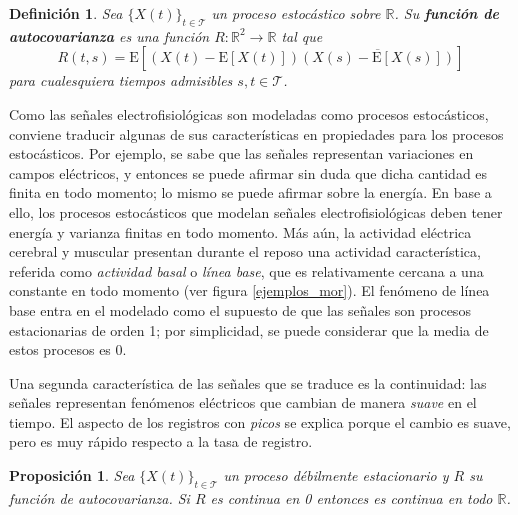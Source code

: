 \documentclass[12pt,letterpaper]{book}
\newtheorem{definicion}{Definición}[chapter]
\newtheorem{proposicion}[teorema]{Proposición}
\newcommand{\R}{\mathbb{R}}
\newcommand{\E}[1]{\mathrm{E}\left[ #1 \right]}
\newcommand{\xt}{$\{X(t)\}_{t\in \mathcal{T}}$ }
\begin{document}
\begin{definicion}
Sea \xt un proceso estocástico sobre $\R$. Su \textbf{función de autocovarianza} es una función $R: \R^{2}\rightarrow \R$ tal que
\begin{equation}
R(t,s) = \E{\left(X(t) - \E{X(t)}\right)\overline{\left(X(s) - \E{X(s)}\right)}}
\end{equation} 
para cualesquiera tiempos admisibles $s, t \in \mathcal{T}$.
\end{definicion}

Como las señales electrofisiológicas son modeladas como procesos estocásticos, conviene traducir algunas de sus características en propiedades para los procesos estocásticos.
%
Por ejemplo, se sabe que las señales representan variaciones en campos eléctricos, y entonces se puede afirmar sin duda que dicha cantidad es finita en todo momento; lo mismo se puede afirmar sobre la energía.
%
En base a ello, los procesos estocásticos que modelan señales electrofisiológicas deben tener energía y varianza finitas en todo momento.
%
Más aún, la actividad eléctrica cerebral y muscular presentan durante el reposo una actividad característica, referida como \textit{actividad basal} o \textit{línea base}, que es relativamente cercana a una constante en todo momento (ver figura \ref{ejemplos_mor}).
%
El fenómeno de línea base entra en el modelado como el supuesto de que las señales son procesos estacionarias de orden 1; por simplicidad, se puede considerar que la media de estos procesos es 0.

Una segunda característica de las señales que se traduce es la continuidad: las señales representan fenómenos eléctricos que cambian de manera \textit{suave} en el tiempo.
%
El aspecto de los registros con \textit{picos} se explica porque el cambio es suave, pero es muy rápido respecto a la tasa de registro.

\begin{proposicion}
Sea \xt un proceso débilmente estacionario y $R$ su función de autocovarianza. Si $R$ es continua
en 0 entonces es continua en todo $\R$.
\end{proposicion}
\end{document}
